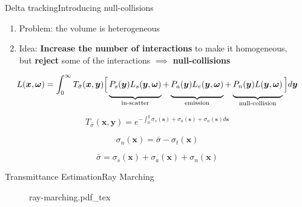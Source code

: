 \documentclass[
  english,            %
  aspectratio=169,    %
]{tumbeamer}
\newcommand\bx[0]{\bm{x}}
\newcommand\by[0]{\bm{y}}
\newcommand\bomega[0]{\bm{\omega}}
\newcommand*\mystrut[1]{\vrule width0pt height0pt depth#1\relax}
\begin{document}
\begin{frame}{Delta tracking}{Introducing null-collisions}
\begin{enumerate}
  \item Problem: the volume is heterogeneous
  \item Idea: \textbf{Increase the number of interactions} to make it
    homogeneous,\\
    but \textbf{reject} some of the interactions $\implies$
    \textbf{null-collisions}
\end{enumerate}

\begin{equation}
    L(\bx, \bomega) = \int_0^\infty 
    T_{\bar\sigma}(\bm{x},\bm{y})
    \Big[
        \underbrace{\mystrut{2ex}
            P_s(\by)L_s(\by, \bomega)
        }_{\text{in-scatter}}
        + 
        \underbrace{\mystrut{2ex}
            P_a(\by)L_e(\by, \bomega)
        }_{\text{emission}}
        +
        \underbrace{\mystrut{2ex}
            P_n(\by)L(\by, \bomega)
        }_{\text{null-collision}}
    \Big]
    d\by
\end{equation}

\vfill
\begin{equation}
  T_{\bar\sigma}(\bm{x},\bm{y}) = 
  e^{-\int_0^y \sigma_s(\bm{s}) + \sigma_a(\bm{s}) + \sigma_n(\bm{s}) d\bm{s}}
\end{equation}

\begin{equation}
  \sigma_n(\bx) = \bar\sigma - \sigma_t(\bx)
\end{equation}

\begin{equation}
  \bar\sigma = \sigma_s(\bm{x}) + \sigma_a(\bm{x}) + \sigma_n(\bm{x})
\end{equation}

\end{frame}

\begin{frame}{Transmittance Estimation}{Ray Marching}
\begin{figure}[ht]
    \centering
    \def\svgwidth{0.6\columnwidth}
    {ray-marching.pdf_tex}
\end{figure}
\end{frame}
\end{document}
